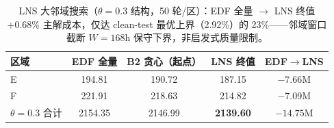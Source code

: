 \begin{table}[h]
\centering
\footnotesize
\begin{tabular}{lcccc}
\toprule
区域 & EDF 全量 & B2 贪心（起点） & LNS 终值 & EDF$\rightarrow$LNS \\
\midrule
E & 194.81 & 190.72 & 187.15 & $-7.66$M \\
F & 221.91 & 218.63 & 214.82 & $-7.09$M \\
$\theta{=}0.3$ 合计 & 2154.35 & 2146.99 & \textbf{2139.60} & $-14.75$M \\
\bottomrule
\end{tabular}
\caption{LNS 大邻域搜索（$\theta=0.3$ 结构，50 轮/区）：EDF 全量 $\rightarrow$ LNS 终值 $+0.68\%$ 主解成本，仅达 clean-test 最优上界（2.92\%）的 23\%——邻域窗口截断 $W=168$h 保守下界，非启发式质量限制。}
\label{tab:s4-lns}
\end{table}
